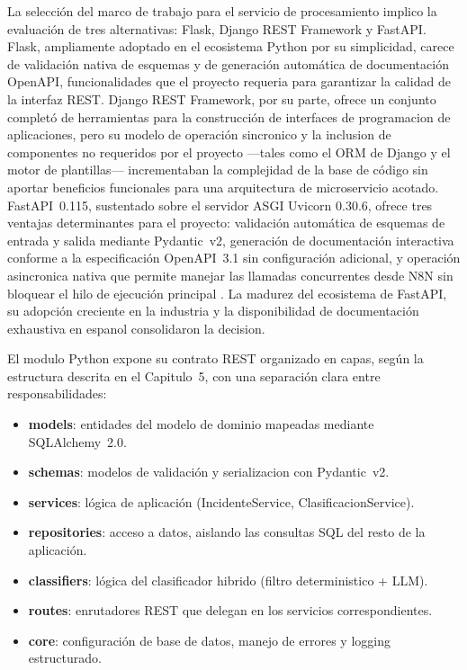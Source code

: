 La selección del marco de trabajo para el servicio de procesamiento implico la evaluación de tres alternativas: Flask, Django REST Framework y FastAPI. Flask, ampliamente adoptado en el ecosistema Python por su simplicidad, carece de validación nativa de esquemas y de generación automática de documentación OpenAPI, funcionalidades que el proyecto requeria para garantizar la calidad de la interfaz REST. Django REST Framework, por su parte, ofrece un conjunto completó de herramientas para la construcción de interfaces de programacion de aplicaciones, pero su modelo de operación sincronico y la inclusion de componentes no requeridos por el proyecto ---tales como el ORM de Django y el motor de plantillas--- incrementaban la complejidad de la base de código sin aportar beneficios funcionales para una arquitectura de microservicio acotado. FastAPI~0.115, sustentado sobre el servidor ASGI Uvicorn 0.30.6, ofrece tres ventajas determinantes para el proyecto: validación automática de esquemas de entrada y salida mediante Pydantic~v2, generación de documentación interactiva conforme a la especificación OpenAPI~3.1 sin configuración adicional, y operación asincronica nativa que permite manejar las llamadas concurrentes desde N8N sin bloquear el hilo de ejecución principal \parencite{Tiangolo2024_fastapi}. La madurez del ecosistema de FastAPI, su adopción creciente en la industria y la disponibilidad de documentación exhaustiva en espanol consolidaron la decision.

El modulo Python expone su contrato REST organizado en capas, según la estructura descrita en el Capitulo~5, con una separación clara entre responsabilidades:

\begin{itemize}
  \item \textbf{models}: entidades del modelo de dominio mapeadas mediante SQLAlchemy~2.0.
  \item \textbf{schemas}: modelos de validación y serializacion con Pydantic~v2.
  \item \textbf{services}: lógica de aplicación (IncidenteService, ClasificacionService).
  \item \textbf{repositories}: acceso a datos, aislando las consultas SQL del resto de la aplicación.
  \item \textbf{classifiers}: lógica del clasificador hibrido (filtro deterministico + LLM).
  \item \textbf{routes}: enrutadores REST que delegan en los servicios correspondientes.
  \item \textbf{core}: configuración de base de datos, manejo de errores y logging estructurado.
\end{itemize}

